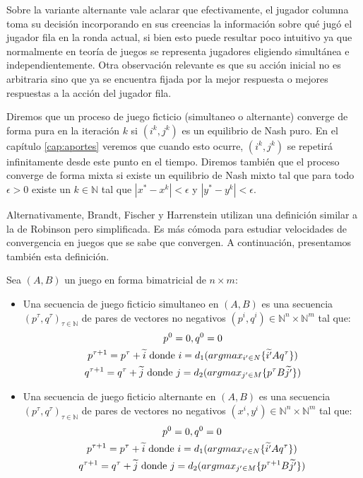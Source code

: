 Sobre la variante alternante vale aclarar que efectivamente, el jugador columna toma su decisión incorporando en sus creencias la información sobre qué jugó el jugador fila en la ronda actual, si bien esto puede resultar poco intuitivo ya que normalmente en teoría de juegos se representa jugadores eligiendo simultánea e independientemente. Otra observación relevante es que su acción inicial no es arbitraria sino que ya se encuentra fijada por la mejor respuesta o mejores respuestas a la acción del jugador fila.

Diremos que un proceso de juego ficticio (simultaneo o alternante) converge de forma pura en la iteración $k$ si $(i^k, j^k)$ es un equilibrio de Nash puro. En el capítulo \ref{cap:aportes} veremos que cuando esto ocurre, $(i^k, j^k)$ se repetirá infinitamente desde este punto en el tiempo. Diremos también que el proceso converge de forma mixta si existe un equilibrio de Nash mixto tal que para todo $\epsilon > 0$ existe un $k \in \mathbb{N}$ tal que $|x^* - x^k| < \epsilon$ y $|y^* - y^k| < \epsilon$.

Alternativamente, Brandt, Fischer y Harrenstein utilizan una definición similar a la de Robinson \cite{robinson:zerosum} pero simplificada. Es más cómoda para estudiar velocidades de convergencia en juegos que se sabe que convergen. A continuación, presentamos también esta definición.

\begin{definition} \label{def:fp:brandt}
    Sea $(A, B)$ un juego en forma bimatricial de $n \times m$:
    \begin{itemize}
        \item Una secuencia de juego ficticio simultaneo en $(A, B)$ es una secuencia $(p^\tau, q^\tau)_{\tau \in \mathbb{N}}$ de pares de vectores no negativos $(p^i, q^i) \in \mathbb{N}^n \times \mathbb{N}^m$ tal que:
        \begin{gather*}
            p^0 = \boldmath{0}, q^0 = \boldmath{0} \\
            p^{\tau+1} = p^{\tau} + \widetilde{i} \text{\ donde $i = d_1(argmax_{i' \in N}\{\widetilde{i'}Aq^\tau\})$} \\
            q^{\tau+1} = q^{\tau} + \widetilde{j} \text{\ donde $j = d_2(argmax_{j' \in M}\{p^{\tau}B\widetilde{j'}\})$}
        \end{gather*}
        \item Una secuencia de juego ficticio alternante en $(A, B)$ es una secuencia $(p^\tau, q^\tau)_{\tau \in \mathbb{N}}$  de pares de vectores no negativos $(x^i, y^i) \in \mathbb{N}^n \times \mathbb{N}^m$ tal que:
        \begin{gather*}
            p^0 = \boldmath{0}, q^0 = \boldmath{0} \\
            p^{\tau+1} = p^{\tau} + \widetilde{i} \text{\ donde $i = d_1(argmax_{i' \in N}\{\widetilde{i'}Aq^\tau\})$} \\
            q^{\tau+1} = q^{\tau} + \widetilde{j} \text{\ donde $j = d_2(argmax_{j' \in M}\{p^{\tau+1}B\widetilde{j'}\})$}
        \end{gather*}
    \end{itemize}
\end{definition}

